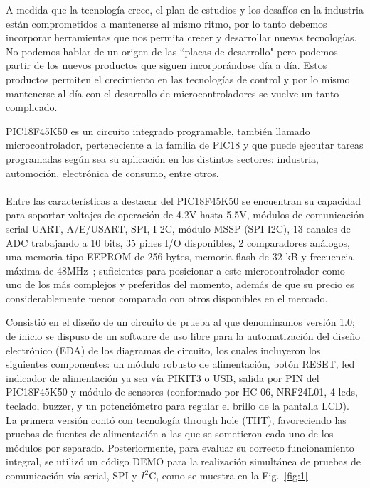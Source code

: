 \documentclass[times, 10pt,twocolumn]{article}
\begin{document}
\raggedbottom
A medida que la tecnología crece, el plan de estudios y los desafíos en la industria están comprometidos a mantenerse al mismo ritmo, por lo tanto debemos incorporar herramientas que nos permita crecer y desarrollar nuevas tecnologías. No podemos hablar de un origen de las ``placas de desarrollo" pero podemos partir de los nuevos productos
que siguen incorporándose día a día. Estos productos permiten el crecimiento en las
tecnologías de control y por lo mismo mantenerse al día con el desarrollo de microcontroladores se vuelve un tanto complicado. 





PIC18F45K50 es un circuito integrado programable, también llamado microcontrolador, perteneciente a la familia de PIC18 y que puede ejecutar tareas programadas según sea su aplicación en los distintos sectores: industria, automoción, electrónica de consumo, entre otros.\\ \\
Entre las características a destacar del PIC18F45K50 se encuentran su capacidad para soportar voltajes de operación de 4.2V hasta 5.5V, módulos de comunicación serial UART, A/E/USART, SPI, I 2C, módulo MSSP (SPI-I2C), 13 canales de ADC trabajando a 10 bits, 35 pines I/O disponibles, 2 comparadores análogos, una memoria tipo EEPROM de 256 bytes, memoria flash de 32 kB y frecuencia máxima de 48MHz~\cite{ex1}; suficientes para posicionar a este microcontrolador como uno de los más complejos y preferidos del momento, además de que su precio es considerablemente menor comparado con otros disponibles en el mercado.



Consistió en el diseño de un circuito de prueba al que denominamos versión 1.0; de inicio se dispuso de un software de uso libre para la automatización del diseño electrónico (EDA) de los diagramas de circuito, los cuales incluyeron los siguientes componentes: un módulo robusto de alimentación, botón RESET, led indicador de alimentación ya sea vía PIKIT3 o USB, salida por PIN del PIC18F45K50 y módulo de sensores (conformado por HC-06, NRF24L01, 4 leds, teclado, buzzer, y un potenciómetro para regular el brillo de la pantalla LCD). \\
La primera versión contó con tecnología through hole (THT), favoreciendo las pruebas de fuentes de alimentación a las que se sometieron cada uno de los módulos por separado. Posteriormente, para evaluar su correcto funcionamiento integral, se utilizó un
código DEMO para la realización simultánea de pruebas de comunicación vía serial, SPI y $I^{2}$C, como se muestra en la Fig.~\ref{fig:1}
\end{document}

